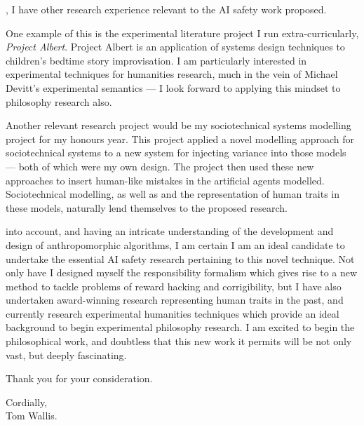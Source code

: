 , I have other research experience relevant to the AI safety work proposed.\par
One example of this is the experimental literature project I run extra-curricularly, \emph{Project Albert}. Project Albert is an application of systems design techniques to children's bedtime story improvisation. I am particularly interested in experimental techniques for humanities research, much in the vein of Michael Devitt's experimental semantics --- I look forward to applying this mindset to philosophy research also.\par
Another relevant research project would be my sociotechnical systems modelling project for my honours year. This project applied a novel modelling approach for sociotechnical systems to a new system for injecting variance into those models --- both of which were my own design. The project then used these new approaches to insert human-like mistakes in the artificial agents modelled. Sociotechnical modelling, as well as and the representation of human traits in these models, naturally lend themselves to the proposed research.\par

 into account, and having an intricate understanding of the development and design of anthropomorphic algorithms, I am certain I am an ideal candidate to undertake the essential AI safety research pertaining to this novel technique. Not only have I designed myself the responsibility formalism which gives rise to a new method to tackle problems of reward hacking and corrigibility, but I have also undertaken award-winning research representing human traits in the past, and currently research experimental humanities techniques which provide an ideal background to begin experimental philosophy research. I am excited to begin the philosophical work, and doubtless that this new work it permits will be not only vast, but deeply fascinating.\par
Thank you for your consideration.

\bigskip
\begin{flushright}
    Cordially,\\
    Tom Wallis.
\end{flushright}




